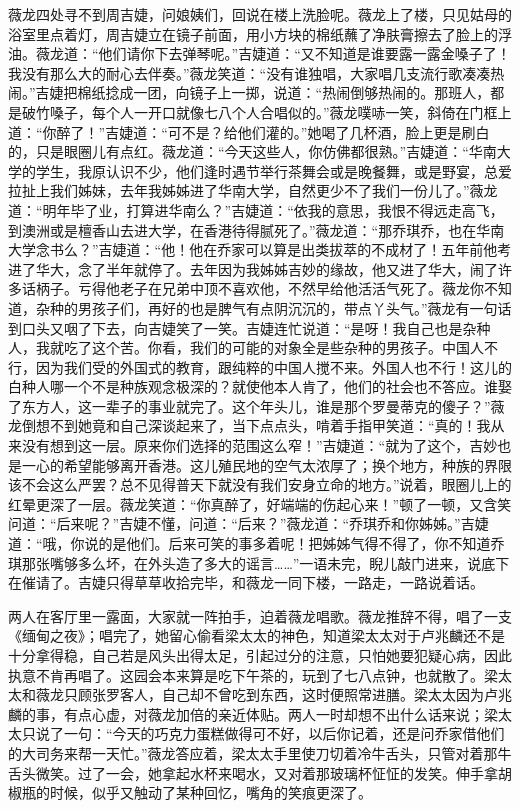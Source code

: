 \par 薇龙四处寻不到周吉婕，问娘姨们，回说在楼上洗脸呢。薇龙上了楼，只见姑母的浴室里点着灯，周吉婕立在镜子前面，用小方块的棉纸蘸了净肤膏擦去了脸上的浮油。薇龙道：“他们请你下去弹琴呢。”吉婕道：“又不知道是谁要露一露金嗓子了！我没有那么大的耐心去伴奏。”薇龙笑道：“没有谁独唱，大家唱几支流行歌凑凑热闹。”吉婕把棉纸捻成一团，向镜子上一掷，说道：“热闹倒够热闹的。那班人，都是破竹嗓子，每个人一开口就像七八个人合唱似的。”薇龙噗哧一笑，斜倚在门框上道：“你醉了！”吉婕道：“可不是？给他们灌的。”她喝了几杯酒，脸上更是刷白的，只是眼圈儿有点红。薇龙道：“今天这些人，你仿佛都很熟。”吉婕道：“华南大学的学生，我原认识不少，他们逢时遇节举行茶舞会或是晚餐舞，或是野宴，总爱拉扯上我们姊妹，去年我姊姊进了华南大学，自然更少不了我们一份儿了。”薇龙道：“明年毕了业，打算进华南么？”吉婕道：“依我的意思，我恨不得远走高飞，到澳洲或是檀香山去进大学，在香港待得腻死了。”薇龙道：“那乔琪乔，也在华南大学念书么？”吉婕道：“他！他在乔家可以算是出类拔萃的不成材了！五年前他考进了华大，念了半年就停了。去年因为我姊姊吉妙的缘故，他又进了华大，闹了许多话柄子。亏得他老子在兄弟中顶不喜欢他，不然早给他活活气死了。薇龙你不知道，杂种的男孩子们，再好的也是脾气有点阴沉沉的，带点丫头气。”薇龙有一句话到口头又咽了下去，向吉婕笑了一笑。吉婕连忙说道：“是呀！我自己也是杂种人，我就吃了这个苦。你看，我们的可能的对象全是些杂种的男孩子。中国人不行，因为我们受的外国式的教育，跟纯粹的中国人搅不来。外国人也不行！这儿的白种人哪一个不是种族观念极深的？就使他本人肯了，他们的社会也不答应。谁娶了东方人，这一辈子的事业就完了。这个年头儿，谁是那个罗曼蒂克的傻子？”薇龙倒想不到她竟和自己深谈起来了，当下点点头，啃着手指甲笑道：“真的！我从来没有想到这一层。原来你们选择的范围这么窄！”吉婕道：“就为了这个，吉妙也是一心的希望能够离开香港。这儿殖民地的空气太浓厚了；换个地方，种族的界限该不会这么严罢？总不见得普天下就没有我们安身立命的地方。”说着，眼圈儿上的红晕更深了一层。薇龙笑道：“你真醉了，好端端的伤起心来！”顿了一顿，又含笑问道：“后来呢？”吉婕不懂，问道：“后来？”薇龙道：“乔琪乔和你姊姊。”吉婕道：“哦，你说的是他们。后来可笑的事多着呢！把姊姊气得不得了，你不知道乔琪那张嘴够多么坏，在外头造了多大的谣言……”一语未完，睨儿敲门进来，说底下在催请了。吉婕只得草草收拾完毕，和薇龙一同下楼，一路走，一路说着话。
\par 两人在客厅里一露面，大家就一阵拍手，迫着薇龙唱歌。薇龙推辞不得，唱了一支《缅甸之夜》；唱完了，她留心偷看梁太太的神色，知道梁太太对于卢兆麟还不是十分拿得稳，自己若是风头出得太足，引起过分的注意，只怕她要犯疑心病，因此执意不肯再唱了。这园会本来算是吃下午茶的，玩到了七八点钟，也就散了。梁太太和薇龙只顾张罗客人，自己却不曾吃到东西，这时便照常进膳。梁太太因为卢兆麟的事，有点心虚，对薇龙加倍的亲近体贴。两人一时却想不出什么话来说；梁太太只说了一句：“今天的巧克力蛋糕做得可不好，以后你记着，还是问乔家借他们的大司务来帮一天忙。”薇龙答应着，梁太太手里使刀切着冷牛舌头，只管对着那牛舌头微笑。过了一会，她拿起水杯来喝水，又对着那玻璃杯怔怔的发笑。伸手拿胡椒瓶的时候，似乎又触动了某种回忆，嘴角的笑痕更深了。
